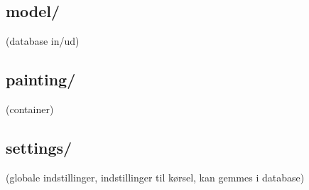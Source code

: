 {\subsection{model/}
(database in/ud)

\subsection{painting/}
(container)

\subsection{settings/}
(globale indstillinger, indstillinger til kørsel, kan gemmes i database)

}

